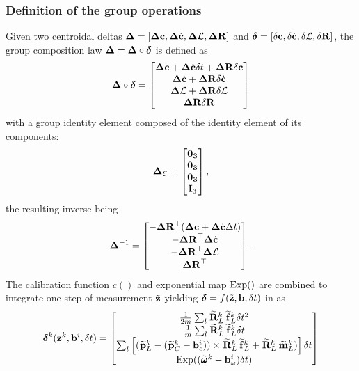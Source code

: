 \subsubsection{Definition of the group operations}

Given two centroidal deltas ${{\bm \Delta}}=[{{\bm \Delta}}{\bf c},{{\bm \Delta}}\dot{{\bf c}},{{\bm \Delta}}\mathcal{L}, {\bm \Delta {\bf R}}]$ and ${\bm \delta}=[\delta{\bf c},\delta\dot{{\bf c}},\delta\mathcal{L}, {\delta{\bf R}}]$, 
the group composition law ${{\bm \Delta}}={{\bm \Delta}}\circ\bm\delta$ is defined as
%
\begin{equation} 
    \D \circ \bm\delta
    =
    \begin{bmatrix}
        \D\COM + \D\COMd\dt + \DR\delta\COM \\
        \D\COMd + \DR\delta\COMd \\
        \D\AM + \DR\delta\AM \\
        \DR\dR 
    \end{bmatrix}
    \label{eq:composition_delta_com}
\end{equation}
%
with a group identity element composed of the identity element of its components:
%
\begin{equation}
    {{\bm \Delta}}_{\mathcal{E}} = \begin{bmatrix}
    \bf0_3\\ \bf0_3 \\ \bf0_3 \\ {\bf I}_3
    \end{bmatrix},
\end{equation}
%
the resulting inverse being
%
\begin{equation}
    \D^{-1} =     
    \begin{bmatrix}
    - \DR\tr(\D\COM + \D\COMd \Dt) \\
    - \DR\tr \D\COMd \\
    - \DR\tr \D\AM \\
      \DR\tr
    \end{bmatrix}.
\label{eq:inverse_delta_com}
\end{equation}
%
The calibration function $c()$ and exponential map $\operatorname*{Exp}()$ are combined to integrate one step of measurement $\tilde{{\bf z}}$
yielding $\bm\delta=f(\tilde{{\bf z}},{\bf b},\delta t)$ in  as
%
\begin{equation}
    \bm\delta^{k}(\bfz^k, \bfb^i, \dt) =
    \begin{bmatrix}
    \frac{1}{2m} \sum_l \Rotm{}{L}^k \forcem{}{L}^k \dt^2
    \\
    \frac{1}{m} \sum_l \Rotm{}{L}^k \forcem{}{L}^k \dt 
    \\
    \sum_l\left[ (\posim{}{L}^k - (\posim{}{C}^k - \bias_c^i)) \times \Rotm{}{L}^k \forcem{}{L}^k + \Rotm{}{L}^k\torquem{}{L}^k) \right] \dt
    \\
    \Exp((\angvelm{}{}^k - \bias_{\omega}^i)\dt)
    \end{bmatrix}
    \label{eq:data2delta_com}
\end{equation}



